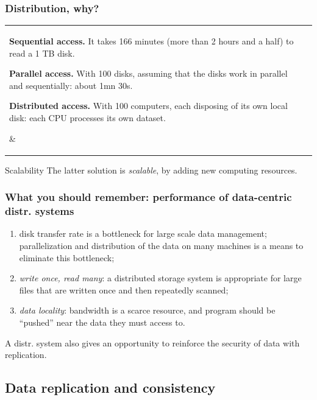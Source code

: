 \documentclass{beamer}
\begin{document}
\begin{frame}
\frametitle{Distribution, why?}

\begin{tabular}{l|p{6cm}}
   \parbox{5cm}{

  \textbf{Sequential access.}  It takes 166 minutes (more than 2 hours and a
  half) to read a 1 TB disk. 
  
  \vfill
  \textbf{Parallel access.} With 100 disks, assuming that the disks work in
  parallel and sequentially:  about 1mn 30s.
 \vfill
 
 \textbf{Distributed access.} With 100 computers, each disposing of its own
 local disk: each CPU processes its own dataset.  
   }  %
  & 
  \parbox{6cm}{ }
\end{tabular}
\vfill

\begin{beamerboxesrounded}{Scalability}
The latter solution is \emph{scalable}, by adding new computing resources.
\end{beamerboxesrounded}

\end{frame}


\begin{frame}
\frametitle{What you should remember: performance of data-centric distr.
systems}

   \begin{enumerate}
      \item disk transfer rate is a bottleneck for large scale data management;
      parallelization and distribution of the data on many machines is a means
      to eliminate this bottleneck;
      \item \emph{write once, read many}: a distributed storage system is
      appropriate for large files that are written once and then
      repeatedly scanned;
       \item \emph{data locality}: bandwidth is a scarce resource, and program
      should be ``pushed'' near the data they must access to.
     \end{enumerate}

A distr. system also gives an opportunity to reinforce the security
of data with \alert{replication}.
      
\end{frame}

\subsection{Data replication and consistency}
\end{document}
